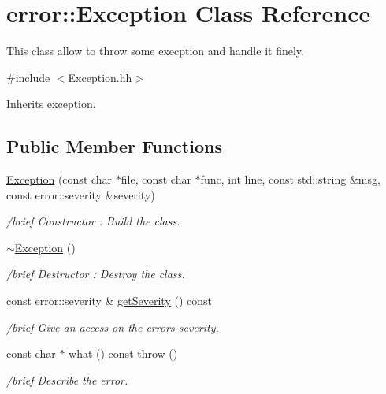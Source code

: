 \hypertarget{classerror_1_1Exception}{}\section{error\+:\+:Exception Class Reference}
\label{classerror_1_1Exception}


This class allow to throw some execption and handle it finely.  




{\ttfamily \#include $<$Exception.\+hh$>$}



Inherits exception.

\subsection*{Public Member Functions}
\begin{DoxyCompactItemize}
\item 
\hyperlink{classerror_1_1Exception_a7f444a1aa89266d62f5d17b13442afaf}{Exception} (const char $\ast$file, const char $\ast$func, int line, const std\+::string \&msg, const error\+::severity \&severity)
\begin{DoxyCompactList}\small\item\em /brief Constructor \+: Build the class. \end{DoxyCompactList}\item 
\hyperlink{classerror_1_1Exception_a1350d8f9d039facfd991b6782387eae5}{$\sim$\+Exception} ()
\begin{DoxyCompactList}\small\item\em /brief Destructor \+: Destroy the class. \end{DoxyCompactList}\item 
const error\+::severity \& \hyperlink{classerror_1_1Exception_a05f9c8eecf03bb0ca05d5fe2ec7fb36a}{get\+Severity} () const
\begin{DoxyCompactList}\small\item\em /brief Give an access on the error\textquotesingle{}s severity. \end{DoxyCompactList}\item 
const char $\ast$ \hyperlink{classerror_1_1Exception_a30163f5666745344a3aeba609727fb5a}{what} () const  throw ()
\begin{DoxyCompactList}\small\item\em /brief Describe the error. \end{DoxyCompactList}\end{DoxyCompactItemize}


